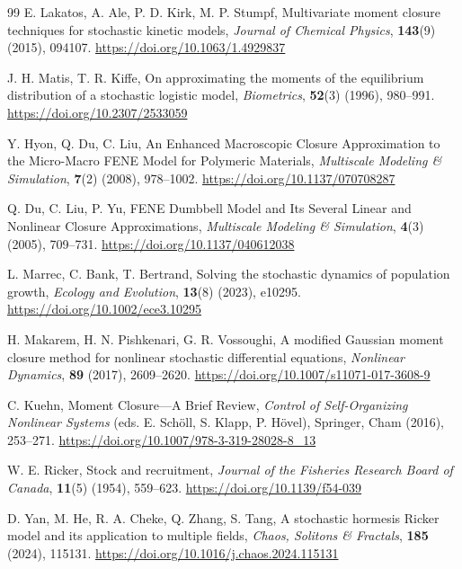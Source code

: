 \documentclass[12pt]{article}
\theoremstyle{definition}
\newcommand{\doilink}[1]{\href{#1}{#1}}
\begin{document}
\begin{thebibliography}{99}
\newblock E. Lakatos, A. Ale, P. D. Kirk, M. P. Stumpf,
\newblock Multivariate moment closure techniques for stochastic kinetic models,
\emph{Journal of Chemical Physics}, \textbf{143}(9) (2015), 094107.
\doilink{https://doi.org/10.1063/1.4929837}

\newblock J. H. Matis, T. R. Kiffe,
\newblock On approximating the moments of the equilibrium distribution of a stochastic logistic model,
\emph{Biometrics}, \textbf{52}(3) (1996), 980--991.
\doilink{https://doi.org/10.2307/2533059}


\newblock Y. Hyon, Q. Du, C. Liu,
\newblock An Enhanced Macroscopic Closure Approximation to the Micro-Macro FENE Model for Polymeric Materials,
\newblock \emph{Multiscale Modeling \& Simulation}, \textbf{7}(2) (2008), 978--1002.
\doilink{https://doi.org/10.1137/070708287}

\newblock Q. Du, C. Liu, P. Yu,
\newblock FENE Dumbbell Model and Its Several Linear and Nonlinear Closure Approximations,
\newblock \emph{Multiscale Modeling \& Simulation}, \textbf{4}(3) (2005), 709--731.
\doilink{https://doi.org/10.1137/040612038}


\newblock L. Marrec, C. Bank, T. Bertrand,
\newblock Solving the stochastic dynamics of population growth,
\emph{Ecology and Evolution}, \textbf{13}(8) (2023), e10295.
\doilink{https://doi.org/10.1002/ece3.10295}

\newblock H. Makarem, H. N. Pishkenari, G. R. Vossoughi,
\newblock A modified Gaussian moment closure method for nonlinear stochastic differential equations,
\emph{Nonlinear Dynamics}, \textbf{89} (2017), 2609–2620.
\doilink{https://doi.org/10.1007/s11071-017-3608-9}

\newblock C. Kuehn,
\newblock Moment Closure—A Brief Review,
\emph{Control of Self-Organizing Nonlinear Systems} (eds. E. Schöll, S. Klapp, P. Hövel),
Springer, Cham (2016), 253--271.
\doilink{https://doi.org/10.1007/978-3-319-28028-8\_13}


\newblock W. E. Ricker,
\newblock Stock and recruitment,
\newblock \emph{Journal of the Fisheries Research Board of Canada}, \textbf{11}(5) (1954), 559--623.
\doilink{https://doi.org/10.1139/f54-039}

\newblock D. Yan, M. He, R. A. Cheke, Q. Zhang, S. Tang,
\newblock A stochastic hormesis Ricker model and its application to multiple fields,
\newblock \emph{Chaos, Solitons \& Fractals}, \textbf{185} (2024), 115131.
\doilink{https://doi.org/10.1016/j.chaos.2024.115131}


\end{thebibliography}
\end{document}
